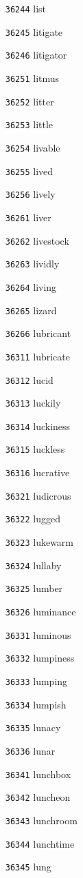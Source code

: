\documentclass[twoside,11pt]{article}
\begin{document}
\begin{multicols}{5}
\begin{enumerate}
\item[\texttt{36244}] list
\item[\texttt{36245}] litigate
\item[\texttt{36246}] litigator
\item[\texttt{36251}] litmus
\item[\texttt{36252}] litter
\item[\texttt{36253}] little
\item[\texttt{36254}] livable
\item[\texttt{36255}] lived
\item[\texttt{36256}] lively
\item[\texttt{36261}] liver
\item[\texttt{36262}] livestock
\item[\texttt{36263}] lividly
\item[\texttt{36264}] living
\item[\texttt{36265}] lizard
\item[\texttt{36266}] lubricant
\item[\texttt{36311}] lubricate
\item[\texttt{36312}] lucid
\item[\texttt{36313}] luckily
\item[\texttt{36314}] luckiness
\item[\texttt{36315}] luckless
\item[\texttt{36316}] lucrative
\item[\texttt{36321}] ludicrous
\item[\texttt{36322}] lugged
\item[\texttt{36323}] lukewarm
\item[\texttt{36324}] lullaby
\item[\texttt{36325}] lumber
\item[\texttt{36326}] luminance
\item[\texttt{36331}] luminous
\item[\texttt{36332}] lumpiness
\item[\texttt{36333}] lumping
\item[\texttt{36334}] lumpish
\item[\texttt{36335}] lunacy
\item[\texttt{36336}] lunar
\item[\texttt{36341}] lunchbox
\item[\texttt{36342}] luncheon
\item[\texttt{36343}] lunchroom
\item[\texttt{36344}] lunchtime
\item[\texttt{36345}] lung

\end{enumerate}
\end{multicols}
\end{document}
